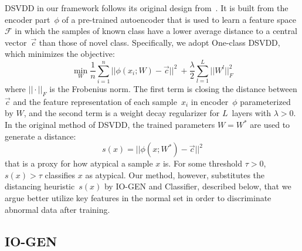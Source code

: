 \documentclass[letterpaper]{article} %
\begin{document}
DSVDD in our framework follows its original design
from~\citet{RVGDSBMK18}. It is built from the encoder part~$\phi$ of a
pre-trained autoencoder that is used to learn a feature
space~$\mathcal{F}$ in which the samples of known class have a lower
average distance to a central vector~$\vec{c}$ than those of novel
class. Specifically, we adopt One-class DSVDD, which minimizes the
objective:
\begin{equation*}
\label{eq:dsvdd_obj}
\min_{W} \frac{1}{n} \sum_{i=1}^{n} ||\phi(x_{i}; W) - \vec{c}||^{2} \
+ \frac{\lambda}{2} \sum_{l=1}^{L} || W^l ||_{F}^{2}
\end{equation*}
where $|| \cdot ||_{F}$ is the Frobenius norm. The first term is closing
the distance between $\vec{c}$ and the feature representation of each
sample~$x_i$ in encoder~$\phi$ parameterized by $W$, and the second term
is a weight decay regularizer for $L$~layers with $\lambda > 0$. In the
original method of DSVDD, the trained parameters $W=W^*$ are used to
generate a distance:
\begin{equation*}
\label{eq:dsvdd_score}
s(x) = ||\phi(x;W^{*}) - \vec{c}||^2
\end{equation*}
that is a proxy for how atypical a sample $x$ is. For some threshold
$\tau > 0$, $s(x) > \tau$ classifies $x$ as atypical. Our method,
however, substitutes the distancing heuristic~$s(x)$ by \mbox{IO-GEN} and
Classifier, described below, that we argue better utilize key features
in the normal set in order to discriminate abnormal data after training.

\subsection{IO-GEN}
\label{sec:io_gen}
\end{document}
